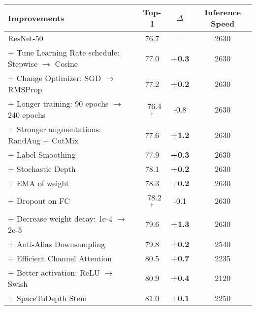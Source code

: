 \newcommand{\improvement}[1]{\textcolor{blue}{#1}}
\newcommand{\decrease}[1]{\textcolor{red}{#1}}
\newcommand{\improvementb}[1]{\textbf{#1}}
\newcommand{\decreaseb}[1]{#1}
\begin{table}[ht!]
    \begin{center}
    \small
    \begin{tabular}{l|cc|c}
      \toprule
      Improvements & Top-1 & $\Delta$  & Inference Speed\\
      \hline
      \hline
      ResNet-50 & 76.7 & --- & 2630\\
      \rowcolor{blue!15}
      + Tune Learning Rate schedule: Stepwise $\rightarrow$ Cosine & 77.0 & \improvementb{+0.3} & 2630\\
      \rowcolor{blue!15}
      + Change Optimizer: SGD $\rightarrow$ RMSProp & 77.2 & \improvementb{+0.2} & 2630\\
      \rowcolor{blue!15}
      + Longer training: 90 epochs $\rightarrow$ 240 epochs& $\;\;$76.4 $^\dag$ & \decreaseb{-0.8} & 2630 \\
      \rowcolor{green!20}
      + Stronger augmentations: RandAug + CutMix & 77.6 & \improvementb{+1.2} & 2630\\
      \rowcolor{green!20}
      + Label Smoothing & 77.9 & \improvementb{+0.3} & 2630\\
      \rowcolor{green!20}
      + Stochastic Depth & 78.1 & \improvementb{+0.2} & 2630\\
      \rowcolor{green!20}
      + EMA of weight & 78.3 & \improvementb{+0.2} & 2630\\
      \rowcolor{green!20}
      + Dropout on FC & $\;\;$78.2 $^\dagger$ & \decreaseb{-0.1} & 2630\\
      \rowcolor{green!20}
      + Decrease weight decay: 1e-4 $\rightarrow$ 2e-5 & 79.6 & \improvementb{+1.3} & 2630\\
      \rowcolor{yellow!20}
      + Anti-Alias Downsampling & 79.8 & \improvementb{+0.2} & 2540 \\
      \rowcolor{yellow!20}
      + Efficient Channel Attention & 80.5 & \improvementb{+0.7} & 2235 \\
      \rowcolor{yellow!20}
      + Better activation: ReLU $\rightarrow$ Swish & 80.9 & \improvementb{+0.4} & 2120 \\
      \rowcolor{yellow!20}
      + SpaceToDepth Stem & 81.0 & \improvementb{+0.1} & 2250 \\

\end{tabular}
\end{center}
\end{table}
